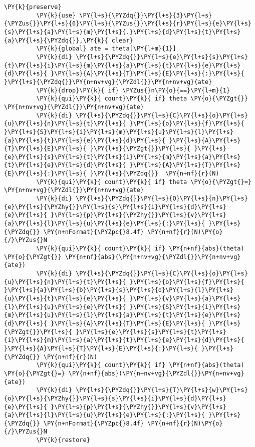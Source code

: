 \documentclass[11pt,notitlepage]{article}\usepackage[]{graphicx}\usepackage[]{color}
\makeatletter
\newenvironment{kframe}{%
 \def\at@end@of@kframe{}%
 \ifinner\ifhmode%
  \def\at@end@of@kframe{\end{minipage}}%
  \begin{minipage}{\columnwidth}%
 \fi\fi%
 \def\FrameCommand##1{\hskip\@totalleftmargin \hskip-\fboxsep
 \colorbox{shadecolor}{##1}\hskip-\fboxsep
     \hskip-\linewidth \hskip-\@totalleftmargin \hskip\columnwidth}%
 \MakeFramed {\advance\hsize-\width
   \@totalleftmargin\z@ \linewidth\hsize
   \@setminipage}}%
 {\par\unskip\endMakeFramed%
 \at@end@of@kframe}
\newenvironment{knitrout}{}{} %
\makeatother
\begin{document}
\begin{knitrout}
\begin{kframe}
    \begin{Verbatim}[commandchars=\\\{\}]
	\PY{k}{preserve} 
         \PY{k}{use} \PY{l+s}{\PYZdq{}}\PY{l+s}{3}\PY{l+s}{\PYZus{}}\PY{l+s}{6}\PY{l+s}{\PYZus{}}\PY{l+s}{r}\PY{l+s}{e}\PY{l+s}{s}\PY{l+s}{a}\PY{l+s}{m}\PY{l+s}{.}\PY{l+s}{d}\PY{l+s}{t}\PY{l+s}{a}\PY{l+s}{\PYZdq{}},\PY{k}{ clear}
         \PY{k}{global} ate = theta[\PY{l+m}{1}]
         \PY{k}{di} \PY{l+s}{\PYZdq{}}\PY{l+s}{e}\PY{l+s}{s}\PY{l+s}{t}\PY{l+s}{i}\PY{l+s}{m}\PY{l+s}{a}\PY{l+s}{t}\PY{l+s}{e}\PY{l+s}{d}\PY{l+s}{ }\PY{l+s}{A}\PY{l+s}{T}\PY{l+s}{E}\PY{l+s}{:}\PY{l+s}{ }\PY{l+s}{\PYZdq{}}\PY{n+nv+vg}{\PYZdl{}}\PY{n+nv+vg}{ate}
         \PY{k}{drop}\PY{k}{ if} \PYZus{}n\PY{o}{==}\PY{l+m}{1}
         \PY{k}{qui}\PY{k}{ count}\PY{k}{ if} theta \PY{o}{\PYZgt{}} \PY{n+nv+vg}{\PYZdl{}}\PY{n+nv+vg}{ate}
         \PY{k}{di} \PY{l+s}{\PYZdq{}}\PY{l+s}{C}\PY{l+s}{o}\PY{l+s}{u}\PY{l+s}{n}\PY{l+s}{t}\PY{l+s}{ }\PY{l+s}{o}\PY{l+s}{f}\PY{l+s}{ }\PY{l+s}{S}\PY{l+s}{i}\PY{l+s}{m}\PY{l+s}{u}\PY{l+s}{l}\PY{l+s}{a}\PY{l+s}{t}\PY{l+s}{e}\PY{l+s}{d}\PY{l+s}{ }\PY{l+s}{A}\PY{l+s}{T}\PY{l+s}{E}\PY{l+s}{ }\PY{l+s}{\PYZgt{}}\PY{l+s}{ }\PY{l+s}{e}\PY{l+s}{s}\PY{l+s}{t}\PY{l+s}{i}\PY{l+s}{m}\PY{l+s}{a}\PY{l+s}{t}\PY{l+s}{e}\PY{l+s}{d}\PY{l+s}{ }\PY{l+s}{A}\PY{l+s}{T}\PY{l+s}{E}\PY{l+s}{:}\PY{l+s}{ }\PY{l+s}{\PYZdq{}}  \PY{n+nf}{r}(N)
         \PY{k}{qui}\PY{k}{ count}\PY{k}{ if} theta \PY{o}{\PYZgt{}=} \PY{n+nv+vg}{\PYZdl{}}\PY{n+nv+vg}{ate}
         \PY{k}{di} \PY{l+s}{\PYZdq{}}\PY{l+s}{O}\PY{l+s}{n}\PY{l+s}{e}\PY{l+s}{\PYZhy{}}\PY{l+s}{s}\PY{l+s}{i}\PY{l+s}{d}\PY{l+s}{e}\PY{l+s}{ }\PY{l+s}{p}\PY{l+s}{\PYZhy{}}\PY{l+s}{v}\PY{l+s}{a}\PY{l+s}{l}\PY{l+s}{u}\PY{l+s}{e}\PY{l+s}{:}\PY{l+s}{ }\PY{l+s}{\PYZdq{}} \PY{n+nFormat}{\PYZpc{}8.4f} \PY{n+nf}{r}(N)\PY{o}{/}\PYZus{}N
         \PY{k}{qui}\PY{k}{ count}\PY{k}{ if} \PY{n+nf}{abs}(theta) \PY{o}{\PYZgt{}} \PY{n+nf}{abs}(\PY{n+nv+vg}{\PYZdl{}}\PY{n+nv+vg}{ate})
         \PY{k}{di} \PY{l+s}{\PYZdq{}}\PY{l+s}{C}\PY{l+s}{o}\PY{l+s}{u}\PY{l+s}{n}\PY{l+s}{t}\PY{l+s}{ }\PY{l+s}{o}\PY{l+s}{f}\PY{l+s}{ }\PY{l+s}{a}\PY{l+s}{b}\PY{l+s}{s}\PY{l+s}{o}\PY{l+s}{l}\PY{l+s}{u}\PY{l+s}{t}\PY{l+s}{e}\PY{l+s}{ }\PY{l+s}{v}\PY{l+s}{a}\PY{l+s}{l}\PY{l+s}{u}\PY{l+s}{e}\PY{l+s}{ }\PY{l+s}{S}\PY{l+s}{i}\PY{l+s}{m}\PY{l+s}{u}\PY{l+s}{l}\PY{l+s}{a}\PY{l+s}{t}\PY{l+s}{e}\PY{l+s}{d}\PY{l+s}{ }\PY{l+s}{A}\PY{l+s}{T}\PY{l+s}{E}\PY{l+s}{ }\PY{l+s}{\PYZgt{}}\PY{l+s}{ }\PY{l+s}{e}\PY{l+s}{s}\PY{l+s}{t}\PY{l+s}{i}\PY{l+s}{m}\PY{l+s}{a}\PY{l+s}{t}\PY{l+s}{e}\PY{l+s}{d}\PY{l+s}{ }\PY{l+s}{A}\PY{l+s}{T}\PY{l+s}{E}\PY{l+s}{:}\PY{l+s}{ }\PY{l+s}{\PYZdq{}} \PY{n+nf}{r}(N)
         \PY{k}{qui}\PY{k}{ count}\PY{k}{ if} \PY{n+nf}{abs}(theta) \PY{o}{\PYZgt{}=} \PY{n+nf}{abs}(\PY{n+nv+vg}{\PYZdl{}}\PY{n+nv+vg}{ate})
         \PY{k}{di} \PY{l+s}{\PYZdq{}}\PY{l+s}{T}\PY{l+s}{w}\PY{l+s}{o}\PY{l+s}{\PYZhy{}}\PY{l+s}{s}\PY{l+s}{i}\PY{l+s}{d}\PY{l+s}{e}\PY{l+s}{ }\PY{l+s}{p}\PY{l+s}{\PYZhy{}}\PY{l+s}{v}\PY{l+s}{a}\PY{l+s}{l}\PY{l+s}{u}\PY{l+s}{e}\PY{l+s}{:}\PY{l+s}{ }\PY{l+s}{\PYZdq{}} \PY{n+nFormat}{\PYZpc{}8.4f} \PY{n+nf}{r}(N)\PY{o}{/}\PYZus{}N
         \PY{k}{restore}
\end{Verbatim}


\end{kframe}
\end{knitrout}
\end{document}
